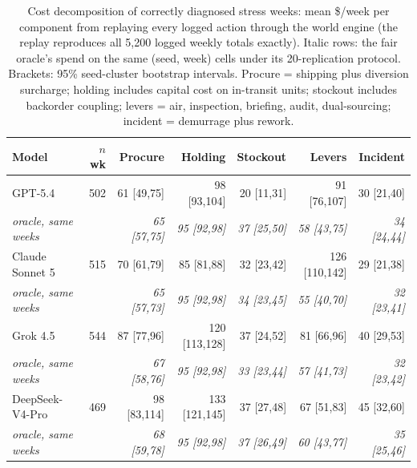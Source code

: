 \documentclass{article}
\begin{document}
\begin{table}[t]
  \centering
  \small
  \begin{tabular}{lrrrrrr}
    \toprule
    Model & $n$ wk & Procure & Holding & Stockout & Levers & Incident \\
    \midrule
    GPT-5.4 & 502 & 61 [49,75] & 98 [93,104] & 20 [11,31] & 91 [76,107] & 30 [21,40] \\
    \quad\emph{oracle, same weeks} & & \emph{65 [57,75]} & \emph{95 [92,98]} & \emph{37 [25,50]} & \emph{58 [43,75]} & \emph{34 [24,44]} \\
    Claude Sonnet 5 & 515 & 70 [61,79] & 85 [81,88] & 32 [23,42] & 126 [110,142] & 29 [21,38] \\
    \quad\emph{oracle, same weeks} & & \emph{65 [57,73]} & \emph{95 [92,98]} & \emph{34 [23,45]} & \emph{55 [40,70]} & \emph{32 [23,41]} \\
    Grok 4.5 & 544 & 87 [77,96] & 120 [113,128] & 37 [24,52] & 81 [66,96] & 40 [29,53] \\
    \quad\emph{oracle, same weeks} & & \emph{67 [58,76]} & \emph{95 [92,98]} & \emph{33 [23,44]} & \emph{57 [41,73]} & \emph{32 [23,42]} \\
    DeepSeek-V4-Pro & 469 & 98 [83,114] & 133 [121,145] & 37 [27,48] & 67 [51,83] & 45 [32,60] \\
    \quad\emph{oracle, same weeks} & & \emph{68 [59,78]} & \emph{95 [92,98]} & \emph{37 [26,49]} & \emph{60 [43,77]} & \emph{35 [25,46]} \\
    \bottomrule
  \end{tabular}
  \caption{Cost decomposition of correctly diagnosed stress weeks: mean
  \$/week per component from replaying every logged action through the
  world engine (the replay reproduces all 5{,}200 logged weekly totals
  exactly). Italic rows: the fair oracle's spend on the same (seed, week)
  cells under its 20-replication protocol. Brackets: 95\% seed-cluster
  bootstrap intervals. Procure = shipping plus diversion surcharge;
  holding includes capital cost on in-transit units; stockout includes
  backorder coupling; levers = air, inspection, briefing, audit,
  dual-sourcing; incident = demurrage plus rework.}
  \label{tab:decomp}
\end{table}
\end{document}

